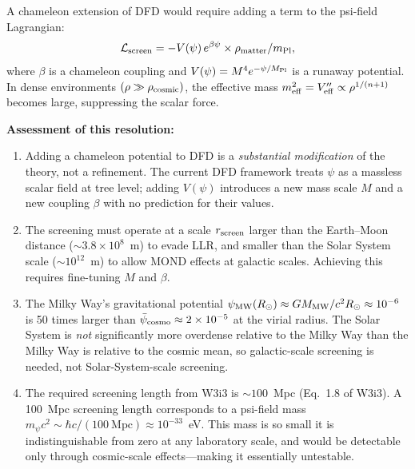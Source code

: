 \documentclass[11pt]{article}
\newcommand{\ee}[1]{\times 10^{#1}}
\newcommand{\psicosmo}{\bar{\psi}_{\rm cosmo}}
\begin{document}
A chameleon extension of DFD would require adding a term to the psi-field
Lagrangian:
\begin{equation}
\mathcal{L}_{\rm screen} = -V(\psi)\,e^{\beta\psi} \times \rho_{\rm matter}/m_{\rm Pl},
\label{eq:L-screen}
\end{equation}
where $\beta$ is a chameleon coupling and $V(\psi) = M^4 e^{-\psi/M_{\rm Pl}}$
is a runaway potential. In dense environments $(\rho \gg \rho_{\rm cosmic})$, the
effective mass $m_{\rm eff}^2 = V''_{\rm eff} \propto \rho^{1/(n+1)}$ becomes
large, suppressing the scalar force.

\textbf{Assessment of this resolution:}
\begin{enumerate}
\item Adding a chameleon potential to DFD is a \emph{substantial modification}
  of the theory, not a refinement. The current DFD framework treats $\psi$ as
  a massless scalar field at tree level; adding $V(\psi)$ introduces a new
  mass scale $M$ and a new coupling $\beta$ with no prediction for their values.
\item The screening must operate at a scale $r_{\rm screen}$ larger than the
  Earth--Moon distance ($\sim 3.8\ee{8}$~m) to evade LLR, and smaller than
  the Solar System scale ($\sim 10^{12}$~m) to allow MOND effects at galactic
  scales. Achieving this requires fine-tuning $M$ and $\beta$.
\item The Milky Way's gravitational potential $\psi_{\rm MW}(R_\odot)
  \approx GM_{\rm MW}/c^2 R_\odot \approx 10^{-6}$ is 50 times larger than
  $\psicosmo \approx 2\ee{-5}$ at the virial radius. The Solar System is
  \emph{not} significantly more overdense relative to the Milky Way than the
  Milky Way is relative to the cosmic mean, so galactic-scale screening is
  needed, not Solar-System-scale screening.
\item The required screening length from W3i3 is $\sim 100$~Mpc
  (Eq.~1.8 of W3i3). A 100~Mpc screening length corresponds to a psi-field
  mass $m_\psi c^2 \sim \hbar c / (100~\text{Mpc}) \approx 10^{-33}$~eV.
  This mass is so small it is indistinguishable from zero at any laboratory
  scale, and would be detectable only through cosmic-scale effects---making
  it essentially untestable.
\end{enumerate}
\end{document}
